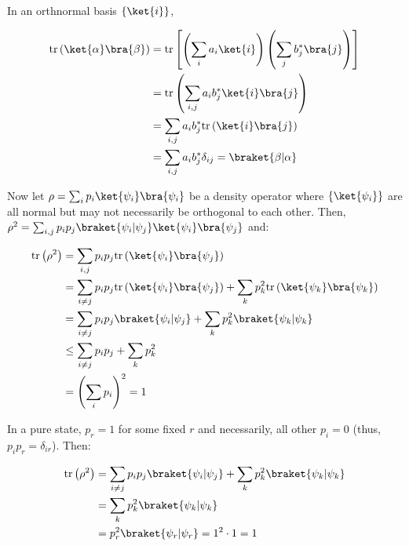 \par In an orthnormal basis $\{\ket{i}\}$,

\begin{align}
\mathrm{tr} \left( \ket{\alpha} \bra{\beta} \right) &= \mathrm{tr} \left[ \left(
\sum_i{a_i \ket{i}} \right) \left( \sum_j{b_j^* \bra{j}} \right) \right] \\
&= \mathrm{tr} \left( \sum_{i, j}{a_i b_j^* \ket{i} \bra{j}} \right) \\
&= \sum_{i, j}{a_i b_j^* \mathrm{tr} \left( \ket{i} \bra{j} \right)} \\
&= \sum_{i, j}{a_i b_j^* \delta_{ij}} = \braket{\beta|\alpha}
\end{align}

\par Now let $\rho = \sum_i{p_i \ket{\psi_i} \bra{\psi_i}}$ be a density
operator where $\{\ket{\psi_i}\}$ are all normal but may not necessarily be
orthogonal to each other. Then, $\rho^2 = \sum_{i, j}{p_i p_j
\braket{\psi_i|\psi_j} \ket{\psi_i} \bra{\psi_j}}$ and:

\begin{align}
\mathrm{tr} \left( \rho^2 \right) &= \sum_{i, j}{p_i p_j \mathrm{tr} \left(
\ket{\psi_i} \bra{\psi_j} \right)} \\
&= \sum_{i \ne j}{p_i p_j \mathrm{tr} \left( \ket{\psi_i} \bra{\psi_j} \right)}
+ \sum_k{p_k^2 \mathrm{tr} \left( \ket{\psi_k} \bra{\psi_k} \right)} \\
&= \sum_{i \ne j}{p_i p_j \braket{\psi_i|\psi_j}} + \sum_k{p_k^2
\braket{\psi_k|\psi_k}} \\
&\le \sum_{i \ne j}{p_i p_j} + \sum_k{p_k^2} \\
&= \left( \sum_i{p_i} \right)^2 = 1
\end{align}

\par In a pure state, $p_r = 1$ for some fixed $r$ and necessarily, all other
$p_i = 0$ (thus, $p_i p_r = \delta_{ir}$). Then:

\begin{align}
\mathrm{tr} \left( \rho^2 \right) &= \sum_{i \ne j}{p_i p_j
\braket{\psi_i|\psi_j}} + \sum_k{p_k^2 \braket{\psi_k|\psi_k}} \\
&= \sum_k{p_k^2 \braket{\psi_k|\psi_k}} \\
&= p_r^2 \braket{\psi_r|\psi_r} = 1^2 \cdot 1 = 1
\end{align}
